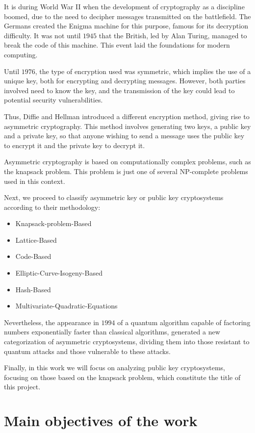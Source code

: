 It is during World War II when the development of cryptography as a discipline boomed, due to the need to decipher messages transmitted on the battlefield. The Germans created the Enigma machine for this purpose, famous for its decryption difficulty. It was not until $1945$ that the British, led by Alan Turing, managed to break the code of this machine. This event laid the foundations for modern computing.

Until $1976$, the type of encryption used was symmetric, which implies the use of a unique key, both for encrypting and decrypting messages. However, both parties involved need to know the key, and the transmission of the key could lead to potential security vulnerabilities.

Thus, Diffie and Hellman introduced a different encryption method, giving rise to asymmetric cryptography. This method involves generating two keys, a public key and a private key, so that anyone wishing to send a message uses the public key to encrypt it and the private key to decrypt it.

Asymmetric cryptography is based on computationally complex problems, such as the knapsack problem. This problem is just one of several NP-complete problems used in this context.

Next, we proceed to classify asymmetric key or public key cryptosystems according to their methodology:
\begin{itemize}
    \item Knapsack-problem-Based
    \item Lattice-Based
    \item Code-Based
    \item Elliptic-Curve-Isogeny-Based
    \item Hash-Based
    \item Multivariate-Quadratic-Equations
\end{itemize}

Nevertheless, the appearance in $1994$ of a quantum algorithm capable of factoring numbers exponentially faster than classical algorithms, generated a new categorization of asymmetric cryptosystems, dividing them into those resistant to quantum attacks and those vulnerable to these attacks. 

Finally, in this work we will focus on analyzing public key cryptosystems, focusing on those based on the knapsack problem, which constitute the title of this project. 

\section*{Main objectives of the work}


